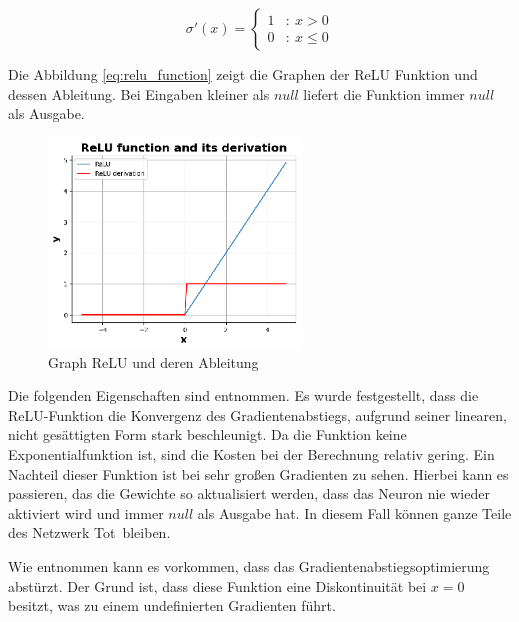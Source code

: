 \begin{equation}\label{eq:derivative_relu_function}
	\sigma' (x) = \left\{
	\begin{array}{cl}
		1 & : \ x > 0 \\
		0 & : \ x \leq 0
	\end{array}
	\right.
\end{equation}

Die Abbildung \ref{eq:relu_function} zeigt die Graphen der ReLU Funktion und dessen Ableitung. Bei Eingaben kleiner als $null$ liefert die Funktion immer $null$ als Ausgabe.

\begin{figure}[!ht]
	\includegraphics[width=0.6\textwidth]{content/chapter_basics/plots/relu_func_plot.eps}
	\centering
	\caption{Graph ReLU und deren Ableitung}
	\label{img:relu_func_graph}
\end{figure}

Die folgenden Eigenschaften sind \cite{cs231n_2024} entnommen. Es wurde festgestellt, dass die ReLU-Funktion die Konvergenz des Gradientenabstiegs, aufgrund seiner linearen, nicht gesättigten Form stark beschleunigt. Da die Funktion keine Exponentialfunktion ist, sind die Kosten bei der Berechnung relativ gering. Ein Nachteil dieser Funktion ist bei sehr großen Gradienten zu sehen. Hierbei kann es passieren, das die Gewichte so aktualisiert werden, dass das Neuron nie wieder aktiviert wird und immer $null$ als Ausgabe hat. In diesem Fall können ganze Teile des Netzwerk \glqq Tot\grqq \ bleiben. 
\vspace{0.2cm}

Wie \cite{yuen_universal_2021} entnommen kann es vorkommen, dass das Gradientenabstiegsoptimierung abstürzt. Der Grund ist, dass diese Funktion eine Diskontinuität bei $x=0$ besitzt, was zu einem undefinierten Gradienten führt.\vspace{0.2cm} 

